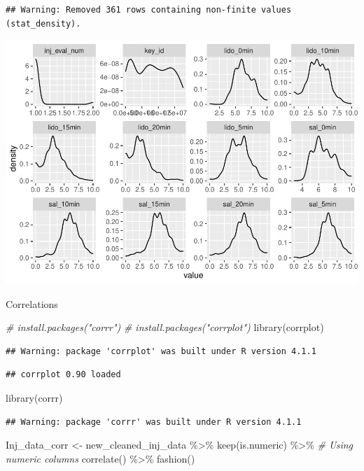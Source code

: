 \documentclass[
]{article}
\newenvironment{Shaded}{\begin{snugshade}}{\end{snugshade}}
\newcommand{\CommentTok}[1]{\textcolor[rgb]{0.56,0.35,0.01}{\textit{#1}}}
\newcommand{\FunctionTok}[1]{\textcolor[rgb]{0.00,0.00,0.00}{#1}}
\newcommand{\NormalTok}[1]{#1}
\newcommand{\OtherTok}[1]{\textcolor[rgb]{0.56,0.35,0.01}{#1}}
\newcommand{\SpecialCharTok}[1]{\textcolor[rgb]{0.00,0.00,0.00}{#1}}
\begin{document}
\begin{verbatim}
## Warning: Removed 361 rows containing non-finite values (stat_density).
\end{verbatim}

\includegraphics{Painreduction_files/figure-latex/unnamed-chunk-8-1.pdf}

Correlations

\begin{Shaded}
\begin{Highlighting}[]
\CommentTok{\# install.packages("corrr")}
\CommentTok{\# install.packages("corrplot")}
\FunctionTok{library}\NormalTok{(corrplot)}
\end{Highlighting}
\end{Shaded}

\begin{verbatim}
## Warning: package 'corrplot' was built under R version 4.1.1
\end{verbatim}

\begin{verbatim}
## corrplot 0.90 loaded
\end{verbatim}

\begin{Shaded}
\begin{Highlighting}[]
\FunctionTok{library}\NormalTok{(corrr)}
\end{Highlighting}
\end{Shaded}

\begin{verbatim}
## Warning: package 'corrr' was built under R version 4.1.1
\end{verbatim}

\begin{Shaded}
\begin{Highlighting}[]
\NormalTok{Inj\_data\_corr }\OtherTok{\textless{}{-}}\NormalTok{ new\_cleaned\_inj\_data }\SpecialCharTok{\%\textgreater{}\%}
  \FunctionTok{keep}\NormalTok{(is.numeric) }\SpecialCharTok{\%\textgreater{}\%}                       \CommentTok{\# Using numeric columns}
   \FunctionTok{correlate}\NormalTok{() }\SpecialCharTok{\%\textgreater{}\%} \FunctionTok{fashion}\NormalTok{()}
\end{Highlighting}
\end{Shaded}
\end{document}

